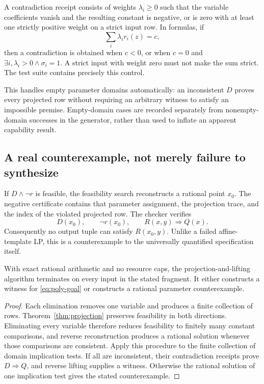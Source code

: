 A contradiction receipt consists of weights \(\lambda_i\ge0\) such that the variable coefficients vanish and the resulting constant is negative, or is zero with at least one strictly positive weight on a strict input row. In formulas, if
\[
 \sum_i\lambda_i r_i(z)=c,
\]
then a contradiction is obtained when \(c<0\), or when \(c=0\) and
\(\exists i,\lambda_i>0\land\sigma_i=1\). A strict input with weight zero must not make the sum strict. The test suite contains precisely this control.

This handles empty parameter domains automatically: an inconsistent \(D\) proves every projected row without requiring an arbitrary witness to satisfy an impossible premise. Empty-domain cases are recorded separately from nonempty-domain successes in the generator, rather than used to inflate an apparent capability result.

\subsection{A real counterexample, not merely failure to synthesize}
If \(D\land\neg r\) is feasible, the feasibility search reconstructs a rational point \(x_0\). The negative certificate contains that parameter assignment, the projection trace, and the index of the violated projected row. The checker verifies
\[
 D(x_0),\qquad \neg r(x_0),\qquad R(x,y)\Longrightarrow Q(x).
\]
Consequently no output tuple can satisfy \(R(x_0,y)\). Unlike a failed affine-template LP, this is a counterexample to the universally quantified specification itself.

\begin{theorem}\label{thm:poly-complete}
With exact rational arithmetic and no resource caps, the projection-and-lifting algorithm terminates on every input in the stated fragment. It either constructs a witness for \eqref{eq:poly-goal} or constructs a rational parameter counterexample.
\end{theorem}
\begin{proof}
Each elimination removes one variable and produces a finite collection of rows. Theorem~\ref{thm:projection} preserves feasibility in both directions. Eliminating every variable therefore reduces feasibility to finitely many constant comparisons, and reverse reconstruction produces a rational solution whenever those comparisons are consistent. Apply this procedure to the finite collection of domain implication tests. If all are inconsistent, their contradiction receipts prove \(D\Rightarrow Q\), and reverse lifting supplies a witness. Otherwise the rational solution of one implication test gives the stated counterexample.
\end{proof}

